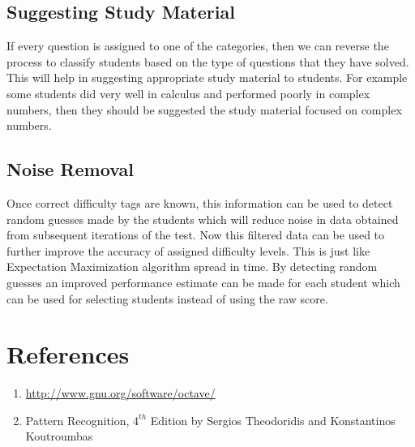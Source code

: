 \documentclass[12pt]{article}
\begin{document}
	\subsection{Suggesting Study Material}
	If every question is assigned to one of the categories, then
	we can reverse the process to classify students based on the type
	of questions that they have solved. This will help in suggesting 
	appropriate study material to students. For example some students
	did very well in calculus and performed poorly in complex numbers,
	then they should be suggested the study material focused on complex
	numbers.
	
	\subsection{Noise Removal}
	Once correct difficulty tags are known, this information can be used
	to detect random guesses made by the students which will reduce noise
	in data obtained from subsequent iterations of the test. Now this filtered
	data can be used to further improve the accuracy of assigned difficulty
	levels. This is just like Expectation Maximization algorithm spread
	in time. By detecting random guesses an improved performance estimate
	can be made for each student which can be used for selecting students
	instead of using the raw score.
	
	
	
	\section{References}
	\begin{enumerate}
		\item \url{http://www.gnu.org/software/octave/}
		\item Pattern Recognition, $4^{th}$ Edition by Sergios Theodoridis
		and Konstantinos Koutroumbas
	\end{enumerate}	 
\end{document}
